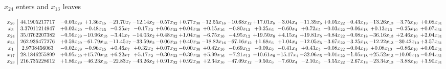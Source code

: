 \documentclass[9pt]{article}
\begin{document}
 $ x_{24} $ enters and $ x_{13} $ leaves 

 \[\begin{array}{c| c c@{\hskip 2pt} c@{\hskip 2pt} c@{\hskip 2pt} c@{\hskip 2pt} c@{\hskip 2pt} c@{\hskip 2pt} c@{\hskip 2pt} c@{\hskip 2pt} c@{\hskip 2pt} c@{\hskip 2pt} c@{\hskip 2pt} c@{\hskip 2pt} c@{\hskip 2pt} c@{\hskip 2pt} c@{\hskip 2pt} c@{\hskip 2pt} }
 x_{26}   &  44.1905217717 & -0.03 x_{29} & +  1.36 x_{15} & -21.70 x_{7} & -12.14 x_{2} & -0.57 x_{32} & +  0.77 x_{30} & -12.55 x_{16} & -10.68 x_{12} & + 17.01 x_{6} & -3.04 x_{4} & -11.39 x_{5} & +  0.05 x_{22} & -0.43 x_{18} & -13.26 x_{13} & -3.75 x_{10} & +  0.08 x_{31}\\
 x_{3}   &  3.37011214947 & +  0.02 x_{29} & -0.48 x_{15} & -0.25 x_{7} & -0.17 x_{2} & +  0.06 x_{32} & +  0.04 x_{30} & +  0.15 x_{16} & -0.80 x_{12} & +  0.25 x_{6} & -0.60 x_{4} & +  0.72 x_{5} & -0.03 x_{22} & -0.06 x_{18} & +  0.13 x_{13} & -0.25 x_{10} & +  0.07 x_{31}\\
 x_{24}   &  35.0762207382 & -0.56 x_{29} & -10.96 x_{15} & -3.41 x_{7} & -14.03 x_{2} & +  0.48 x_{32} & +  1.04 x_{30} & -6.75 x_{16} & -4.95 x_{12} & + 19.50 x_{6} & +  4.15 x_{4} & + 19.81 x_{5} & -0.84 x_{22} & -0.08 x_{18} & -36.16 x_{13} & +  2.46 x_{10} & +  2.04 x_{31}\\
 x_{25}   &  262.936477276 & +  0.59 x_{29} & -61.79 x_{15} & -11.45 x_{7} & -33.59 x_{2} & -0.06 x_{32} & +  0.40 x_{30} & -18.82 x_{16} & -67.16 x_{12} & +  1.68 x_{6} & +  1.04 x_{4} & -12.05 x_{5} & -3.67 x_{22} & -3.25 x_{18} & -12.22 x_{13} & -30.42 x_{10} & +  3.57 x_{31}\\
 x_{1}   &  2.9708456063 & -0.02 x_{29} & -0.96 x_{15} & +  0.46 x_{7} & +  0.32 x_{2} & +  0.07 x_{32} & -0.00 x_{30} & +  0.42 x_{16} & -0.69 x_{12} & -0.09 x_{6} & -0.41 x_{4} & +  0.43 x_{5} & -0.08 x_{22} & -0.04 x_{18} & +  0.08 x_{13} & -0.86 x_{10} & +  0.05 x_{31}\\
 x_{17}   &  28.1846255899 & +  0.95 x_{29} & + 15.70 x_{15} & +  6.22 x_{7} & +  5.17 x_{2} & -0.30 x_{32} & -0.39 x_{30} & +  5.99 x_{16} & -7.21 x_{12} & -10.61 x_{6} & -15.17 x_{4} & -32.96 x_{5} & -0.01 x_{22} & -1.05 x_{18} & + 25.52 x_{13} & -10.00 x_{10} & -0.94 x_{31}\\
 x_{23}   &  216.735228612 & +  1.86 x_{29} & -46.23 x_{15} & -22.83 x_{7} & -43.26 x_{2} & +  0.91 x_{32} & +  0.92 x_{30} & +  2.34 x_{16} & -47.09 x_{12} & -9.50 x_{6} & -7.60 x_{4} & -2.10 x_{5} & -3.55 x_{22} & -2.67 x_{18} & -23.34 x_{13} & -3.88 x_{10} & +  3.90 x_{31}\\

\end{array}\]
\end{document}

